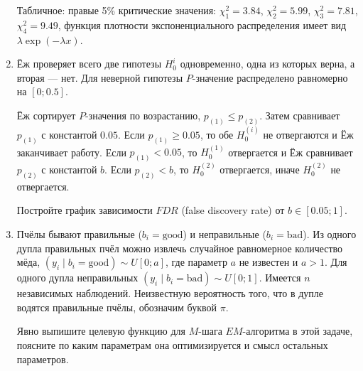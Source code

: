 \documentclass[12pt]{article}
\begin{document}
\begin{enumerate}
Табличное: правые 5\% критические значения: $\chi^2_1 = 3.84$, $\chi^2_2 = 5.99$, $\chi^2_3 = 7.81$, $\chi^2_4=9.49$,
функция плотности экспоненциального распределения имеет вид $\lambda \exp(-\lambda x)$.

\item Ёж проверяет всего две гипотезы $H_0^i$ одновременно, одна из которых верна, а вторая — нет. 
Для неверной гипотезы $P$-значение распределено равномерно на $[0;0.5]$.

Ёж сортирует $P$-значения по возрастанию, $p_{(1)} \leq p_{(2)}$. Затем сравнивает $p_{(1)}$ с константой $0.05$.
Если $p_{(1)} \geq 0.05$, то обе $H_0^{(i)}$ не отвергаются и Ёж заканчивает работу. 
Если $p_{(1)} < 0.05$, то $H_0^{(1)}$ отвергается и Ёж сравнивает $p_{(2)}$ с константой $b$. 
Если $p_{(2)} < b$, то $H_0^{(2)}$ отвергается, иначе $H_0^{(2)}$ не отвергается.

Постройте график зависимости $FDR$ (false discovery rate) от $b \in [0.05;1]$.

\item 
Пчёлы бывают правильные ($b_i = \text{good}$) и неправильные ($b_i = \text{bad}$). 
Из одного дупла правильных пчёл можно извлечь случайное равномерное количество мёда, $(y_i \mid b_i = \text{good}) \sim U[0;a]$, 
где параметр $a$ не известен и $a>1$.
Для одного дупла неправильных $(y_i \mid b_i = \text{bad}) \sim U[0;1]$.
Имеется $n$ независимых наблюдений. 
Неизвестную вероятность того, что в дупле водятся правильные пчёлы, обозначим буквой $\pi$. 

Явно выпишите целевую функцию для $M$-шага $EM$-алгоритма в этой задаче, поясните по каким параметрам она оптимизируется и смысл остальных параметров.

\end{enumerate}
\end{document}
